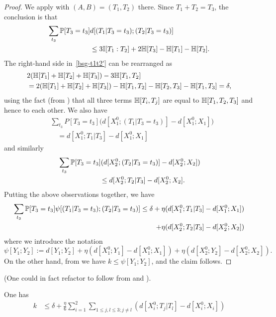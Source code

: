\begin{proof} \leanok
  We apply  with $(A,B) = (T_1, T_2)$ there.
  Since $T_1 + T_2 = T_3$, the conclusion is that
  \begin{align} \nonumber \sum_{t_3} \mathbb{P}[T_3 = t_3] & d[(T_1 | T_3 = t_3); (T_2 | T_3 = t_3)] \\ & \leq 3 \mathbb{I}[T_1 : T_2] + 2 \mathbb{H}[T_3] - \mathbb{H}[T_1] - \mathbb{H}[T_2].\label{bsg-t1t2'}
  \end{align}
  The right-hand side in~\eqref{bsg-t1t2'} can be rearranged as
  \begin{align*} & 2( \mathbb{H}[T_1] + \mathbb{H}[T_2] + \mathbb{H}[T_3]) - 3 \mathbb{H}[T_1,T_2] \\ & = 2(\mathbb{H}[T_1] + \mathbb{H}[T_2] + \mathbb{H}[T_3]) - \mathbb{H}[T_1,T_2] - \mathbb{H}[T_2,T_3] - \mathbb{H}[T_1, T_3] = \delta,\end{align*}
  using the fact (from ) that all three terms $\mathbb{H}[T_i,T_j]$ are equal to $\mathbb{H}[T_1,T_2,T_3]$ and hence to each other.
  We also have
  \begin{align*}
  &  \sum_{t_3} P[T_3 = t_3] \bigl(d[X^0_1; (T_1 | T_3=t_3)] - d[X^0_1;X_1]\bigr) \\
  &\quad = d[X^0_1; T_1 | T_3] - d[X^0_1;X_1]
  \end{align*}
  and similarly
  \begin{align*}
  &  \sum_{t_3} \mathbb{P}[T_3 = t_3] (d[X^0_2;(T_2 | T_3=t_3)] - d[X^0_2; X_2]) \\
  &\quad\quad\quad\quad\quad\quad \leq d[X^0_2;T_2|T_3] - d[X^0_2;X_2].
  \end{align*}
  Putting the above observations together, we have
  \begin{align*}
   \sum_{t_3} \mathbb{P}[T_3=t_3] \psi[(T_1 | T_3=t_3); (T_2 | T_3=t_3)] \leq \delta + \eta (d[X^0_1;T_1|T_3]-d[X^0_1;X_1]) \\
     + \eta (d[X^0_2;T_2|T_3]-d[X^0_2;X_2])
   \end{align*}
where we introduce the notation
\[\psi[Y_1; Y_2] := d[Y_1;Y_2] +  \eta (d[X_1^0;Y_1] - d[X_1^0;X_1]) + \eta(d[X_2^0;Y_2] - d[X_2^0;X_2]).\]
On the other hand, from  we have $k \leq \psi[Y_1;Y_2]$, and the claim follows.
\end{proof}

(One could in fact refactor  to follow from  and ).

\begin{lemma}\label{construct-good-improv}\leanok
One has
\begin{align*}  k & \leq  \delta + \frac{\eta}{6}  \sum_{i=1}^2 \sum_{1 \leq j,l \leq 3; j \neq l} (d[X^0_i;T_j|T_l] - d[X^0_i; X_i])
  \end{align*}
\end{lemma}

